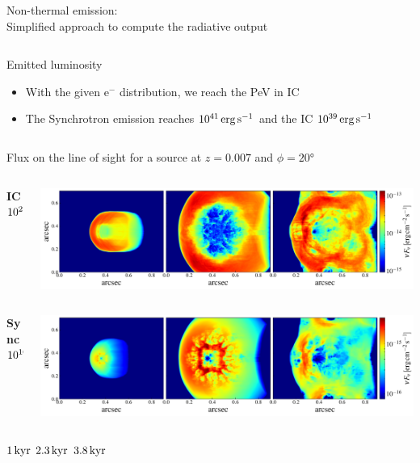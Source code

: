 \begin{frame}{Non-thermal emission:\\
	Simplified approach to compute the radiative output}
\begin{columns}
{\begin{column}{.5\textwidth}
			\begin{exampleblock}{Emitted luminosity}
				\begin{itemize}
					\item With the given e$^{-}$ distribution, we reach the PeV in IC
					\item The Synchrotron emission reaches $10^{41}\,{\rm erg}\,{\rm s}^{-1}$
							and the IC $10^{39}\,{\rm erg}\,{\rm s}^{-1}$
				\end{itemize}
			\end{exampleblock}
			\centering
		\end{column}
		}
	\end{columns}
\end{frame}
\begin{frame}{Flux on the line of sight for a source at $z=0.007$ and $\phi=20$°}
	\begin{columns}
		\begin{column}{0.1\textwidth}
				{\small {\bf IC} \\$10^{27}\,{\rm Hz}$  }
		\end{column}
		\begin{column}{\textwidth}
	\includegraphics[width=\linewidth]{images/2dmaps/2Dmap_flux_freq_27_dist_31_phi_20_ic.pdf}
		\end{column}
	\end{columns}
	\begin{columns}
		\begin{column}{0.1\textwidth}
				{\small{\bf Sync} \\ $10^{10}\,{\rm Hz}$}
		\end{column}
		\begin{column}{\textwidth}

	\includegraphics[width=\linewidth]{images/2dmaps/2Dmap_flux_freq_10_dist_31_phi_20_sync.pdf}
		\end{column}
	\end{columns}
	\vspace{8pt}
		\hspace{70pt} $1\,{\rm kyr}$ \hspace{60pt} $2.3\,{\rm kyr}$ \hspace{60pt} $3.8\,{\rm kyr}$
\end{frame}

